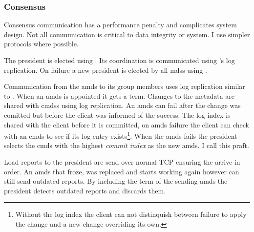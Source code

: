 \subsubsection*{Consensus} \label{sec:concensus} \label{sec:praft}
Consensus communication has a performance penalty and complicates system design. Not all communication is critical to data integrity or system. I use simpler protocols where possible. 

The president is elected using \raft{}. Its coordination is communicated using \raft{}'s log replication. On failure a new president is elected by all \acp{mds} using \raft{}.

Communication from the \ac{amds} to its group members uses log replication similar to \raft{}. When an \ac{amds} is appointed it gets a \raft{} term. Changes to the metadata are shared with \acp{cmds} using log replication. An \ac{amds} can fail after the change was comitted but before the client was informed of the success. The log index is shared with the client before it is committed, on \ac{amds} failure the client can check with an \ac{cmds} to see if its log entry exists\footnote{Without the log index the client can not distinquish between failure to apply the change and a new change overriding its own.}. When the \ac{amds} fails the president selects the \ac{cmds} with the highest \textsl{commit index} as the new \ac{amds}. I call this \ac{praft}.

Load reports to the president are send over normal TCP ensuring the arrive in order. An \ac{amds} that froze, was replaced and starts working again however can still send outdated reports. By including the term of the sending \ac{amds} the president detects outdated reports and discards them.
%
